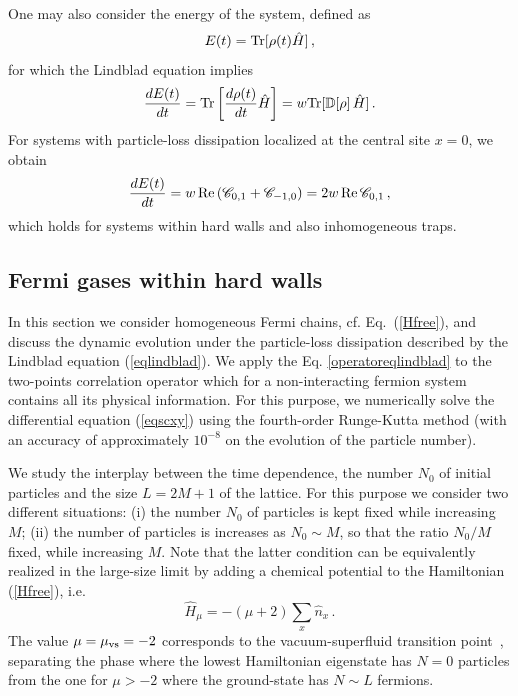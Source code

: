   One may also consider the energy of the system, defined as
  \begin{eqnarray}
  E(t) = {\rm Tr}[\rho(t) \hat H] \,,
  \label{enedef}
  \end{eqnarray}
  for which the Lindblad equation implies
  \begin{eqnarray}
    {d E(t)\over dt} = {\rm Tr}\left[{d\rho(t)\over dt} \hat H\right]= w
    {\rm Tr}[{\mathbb D}[\rho] \,\hat H]\,.
    \label{detg}
  \end{eqnarray}
  For systems with particle-loss dissipation localized at the central
  site $x=0$, we obtain
  \begin{eqnarray}
    {d E(t)\over dt} =
    w \, {\rm Re}\,({\mathscr C}_{0,1}+{\mathscr C}_{-1,0}) =
    2 w \, {\rm Re}\,{\mathscr C}_{0,1}\,,
    \label{derene}
  \end{eqnarray}
  which holds for systems within hard walls and also inhomogeneous
  traps.
  
  \subsection{Fermi gases within hard walls}
  \label{hwbc}
  
  In this section we consider homogeneous Fermi chains, cf.
  Eq.~(\ref{Hfree}), and discuss the dynamic evolution under the
  particle-loss dissipation described by the Lindblad equation
  (\ref{eqlindblad}). We apply the Eq. \eqref{operatoreqlindblad} to the two-points correlation operator which for a non-interacting fermion system contains all its physical information. For this
  purpose, we numerically solve the differential equation (\ref{eqscxy})
  using the fourth-order Runge-Kutta method (with an accuracy of
  approximately $10^{-8}$ on the evolution of the particle number).
  
  We study the interplay between the time dependence, the number $N_0$
  of initial particles and the size $L=2M+1$ of the lattice.  For this
  purpose we consider two different situations: (i) the number $N_0$ of
  particles is kept fixed while increasing $M$; (ii) the number of
  particles is increases as $N_0\sim M$, so that the ratio $N_0/M$
  fixed, while increasing $M$. Note that the latter condition can be
  equivalently realized in the large-size limit by adding a chemical
  potential to the Hamiltonian (\ref{Hfree}), i.e.
  \begin{equation}
  \hat H_\mu = -(\mu+2) \sum _x \hat n_x \,.
  \label{chemicalpot}
  \end{equation}
  The value $\mu=\mu_{\rm vs}=-2$ corresponds to the vacuum-superfluid
  transition point~\cite{S99,ACV-14}, separating the phase
  where the lowest Hamiltonian eigenstate has $N=0$ particles from the
  one for $\mu>-2$ where the ground-state has $N\sim L$ fermions.
  
